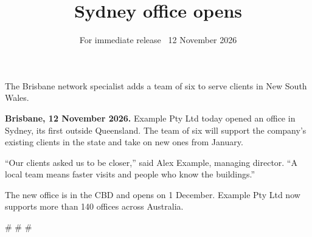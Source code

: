 \documentclass{jupiter-form}
\title{Sydney office opens}
\subtitle{For immediate release \textbar\ 12 November 2026}
\begin{document}
\maketitle
{\color{jpTextMuted}\fontsize{13}{18}\selectfont The Brisbane network specialist adds a team of six to serve clients in New South Wales.\par}
\vspace{5mm}
\noindent\textbf{Brisbane, 12 November 2026.} Example Pty Ltd today opened an office in Sydney, its first outside Queensland. The team of six will support the company's existing clients in the state and take on new ones from January.

``Our clients asked us to be closer,'' said Alex Example, managing director. ``A local team means faster visits and people who know the buildings.''

The new office is in the CBD and opens on 1 December. Example Pty Ltd now supports more than 140 offices across Australia.

\vspace{6mm}
\jprowend
\vspace{3mm}\centerline{\jpmono\small\color{jpTextMuted} \# \# \#}
\end{document}
